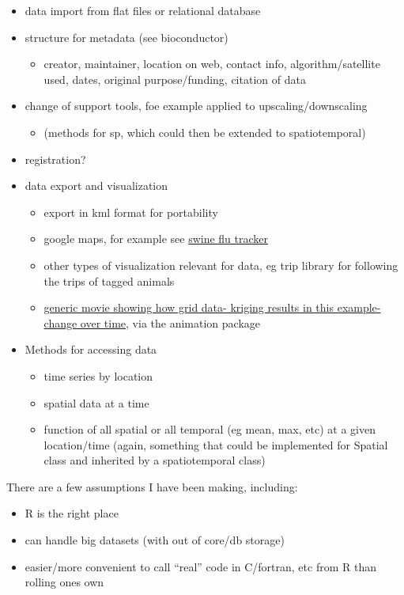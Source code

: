 \documentclass[12pt]{article}
\begin{document}
\begin{itemize}
\item data import from flat files or relational database
\item structure for metadata (see bioconductor)
\begin{itemize}
\item creator, maintainer, location on web, contact info,
algorithm/satellite used, dates, original purpose/funding,
citation of data 
\end{itemize}
\item change of support tools, foe example applied to upscaling/downscaling
\begin{itemize}
\item (methods for sp, which could then be extended to spatiotemporal)
\end{itemize}
\item registration?
\item data export and visualization
\begin{itemize}
\item export in kml format for portability
\item google maps, for example see
  \href{http://googlemapsmania.blogspot.com/2009/04/swine-flu-outbreak-on-google-maps.html}{swine
  flu tracker}
\item other types of visualization relevant for data, eg trip library
  for following the trips of tagged animals
\item
  \href{http://www.isds.duke.edu/~jbc30/Presentations/movie.gif}{generic
  movie showing how grid data- kriging results in this example- change
  over time}, via the animation package \citep{xie09}
\end{itemize}

\item Methods for accessing data
\begin{itemize}
\item time series by location
\item spatial data at a time
\item function of all spatial or all temporal (eg mean, max, etc) at a
  given location/time (again, something that could be implemented for
  Spatial class and inherited by a spatiotemporal class)
\end{itemize}


\end{itemize}

There are a few assumptions I have been making, including:
\begin{itemize}
\item R is the right place
\item can handle big datasets (with out of core/db storage)
\item easier/more convenient to call ``real'' code in C/fortran, etc
  from R than rolling ones own
\end{itemize}
\end{document}
